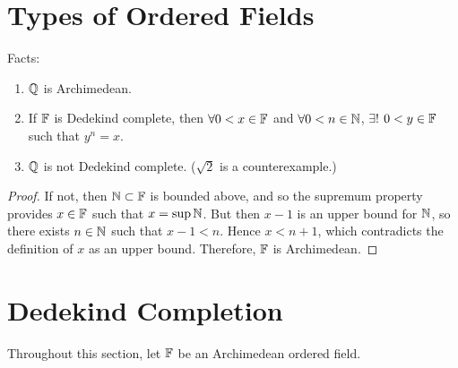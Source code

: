 \documentclass{report}
\begin{document}
\section{Types of Ordered Fields}

\noindent Facts:
\begin{enumerate}
    \item $\QQ$ is Archimedean.
    \item If $\FF$ is Dedekind complete, then $\forall 0 < x \in \FF$ and $\forall 0< n \in \NN$, $\exists !$  $0 < y \in \FF$ such that $y^n = x$.
    \item $\QQ$ is not Dedekind complete. ($\sqrt 2$ is a counterexample.)
\end{enumerate}

\begin{proof}
    If not, then $\NN \subset \FF$ is bounded above, and so the supremum property provides $x \in \FF$ such that $x = \sup \NN$. But then $x - 1$ is an upper bound for $\NN$, so there exists $n \in \NN$ such that $x-1 < n$. Hence $x < n + 1$, which contradicts the definition of $x$ as an upper bound. Therefore, $\FF$ is Archimedean.
\end{proof}

\section{Dedekind Completion}
Throughout this section, let $\FF$ be an Archimedean ordered field.

\end{document}
